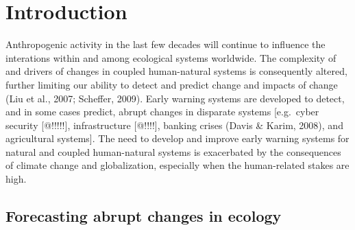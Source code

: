 \documentclass[12pt,twoside,openany]{reedthesis}
\begin{document}
\endgroup{}

\chapter{Introduction}\label{intro}

Anthropogenic activity in the last few decades will continue to
influence the interations within and among ecological systems worldwide.
The complexity of and drivers of changes in coupled human-natural
systems is consequently altered, further limiting our ability to detect
and predict change and impacts of change (Liu et al., 2007; Scheffer,
2009). Early warning systems are developed to detect, and in some cases
predict, abrupt changes in disparate systems {[}e.g.~cyber security
{[}@!!!!!{]}, infrastructure {[}@!!!!{]}, banking crises (Davis \&
Karim, 2008), and agricultural systems{]}. The need to develop and
improve early warning systems for natural and coupled human-natural
systems is exacerbated by the consequences of climate change and
globalization, especially when the human-related stakes are high.

\section{Forecasting abrupt changes in
ecology}\label{forecasting-abrupt-changes-in-ecology}
\end{document}
